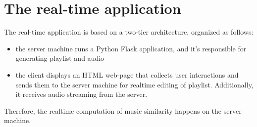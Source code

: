 \chapter{The real-time application} 

\label{Chapter6} 


The real-time application is based on a two-tier architecture, organized as follows:
\begin{itemize}
\item the server machine runs a Python Flask application, and it's responsible for generating playlist and audio
\item the client displays an HTML web-page that collects user interactions and sends them to the server machine for realtime editing of playlist. Additionally, it receives audio streaming from the server.
\end{itemize}

Therefore, the realtime computation of music similarity happens on the server machine.

